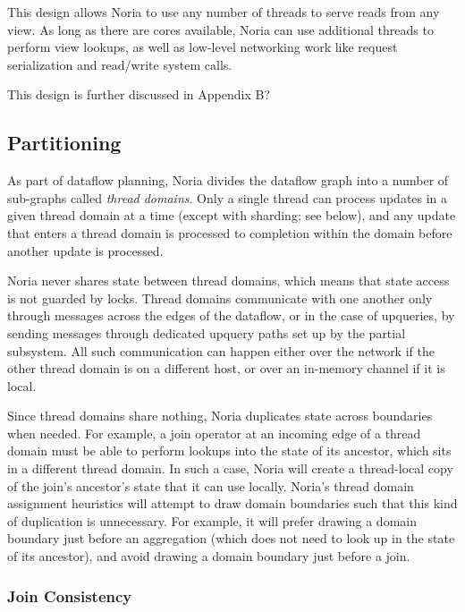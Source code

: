 This design allows Noria to use any number of threads to serve reads from any
view. As long as there are cores available, Noria can use additional threads to
perform view lookups, as well as low-level networking work like request
serialization and read/write system calls.

\begin{inprogress}
  This design is further discussed in Appendix B?
\end{inprogress}

\subsection{Partitioning}

As part of dataflow planning, Noria divides the dataflow graph into a number of
sub-graphs called \textit{thread domains}. Only a single thread can process
updates in a given thread domain at a time (except with sharding; see below),
and any update that enters a thread domain is processed to completion within
the domain before another update is processed.

Noria never shares state between thread domains, which means that state access
is not guarded by locks. Thread domains communicate with one another only
through messages across the edges of the dataflow, or in the case of upqueries,
by sending messages through dedicated upquery paths set up by the partial
subsystem. All such communication can happen either over the network if the
other thread domain is on a different host, or over an in-memory channel if it
is local.

Since thread domains share nothing, Noria duplicates state across boundaries
when needed. For example, a join operator at an incoming edge of a thread domain
must be able to perform lookups into the state of its ancestor, which sits in a
different thread domain. In such a case, Noria will create a thread-local copy
of the join's ancestor's state that it can use locally. Noria's thread domain
assignment heuristics will attempt to draw domain boundaries  such that this
kind of duplication is unnecessary. For example, it will prefer drawing a domain
boundary just before an aggregation (which does not need to look up in the state
of its ancestor), and avoid drawing a domain boundary just before a join.

\subsubsection{Join Consistency}
\label{s:join-state-dupe}

